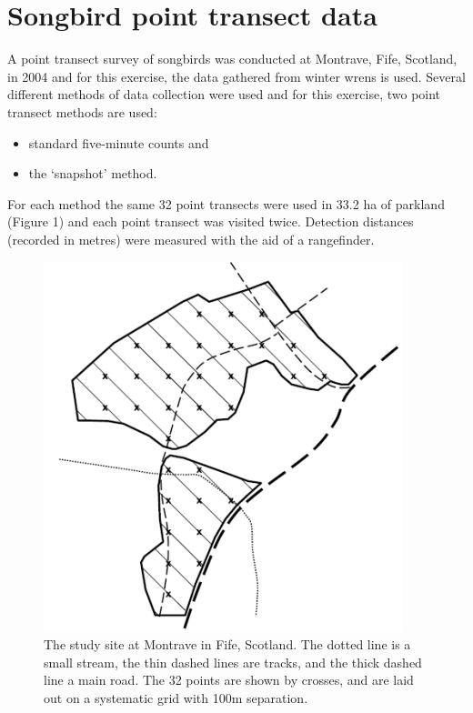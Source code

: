 \documentclass[a4paper]{article}
\begin{document}
\section{Songbird point transect data}

A point transect survey of songbirds was conducted at Montrave, Fife, Scotland, in 2004 \citep{buckland2006} and for this exercise, the data gathered from winter wrens is used. Several different methods of data collection were used and for this exercise, two point transect methods are used:

\begin{itemize}
    \item standard five-minute counts and
    \item the ‘snapshot’ method.
\end{itemize}

For each method the same 32 point transects were used in 33.2 ha of parkland (Figure 1) and each point transect was visited twice. Detection distances (recorded in metres) were measured with the aid of a rangefinder.

\begin{figure}
\centering
\includegraphics[scale=0.5]{Prac_5_Figure_1.png}
\caption{The study site at Montrave in Fife, Scotland. The dotted line is a small stream, the thin dashed lines are tracks, and the thick dashed line a main road. The 32 points are shown by crosses, and are laid out on a systematic grid with 100m separation.}
\end{figure}
\end{document}
